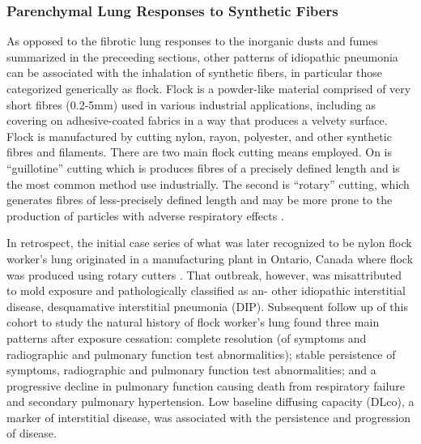 \documentclass[a4paper,12pt]{article}
\begin{document}
\subsubsection{Parenchymal Lung Responses to Synthetic Fibers}

As opposed to the fibrotic lung responses to the inorganic dusts and fumes summarized in the preceeding sections, other patterns of idiopathic pneumonia can be associated with the inhalation of synthetic fibers, in particular those categorized generically as flock. Flock is a powder-like material comprised of very short fibres (0.2-5mm) used in various industrial applications, including as covering on adhesive-coated fabrics in a way that produces a velvety surface. Flock is manufactured by cutting nylon, rayon, polyester, and other synthetic fibres and filaments. There are two main flock cutting means employed. On is “guillotine” cutting which is produces fibres of a precisely defined length and is the most common method use industrially. The second is “rotary” cutting, which generates fibres of less-precisely defined length and may be more prone to the production of particles  with adverse respiratory effects \cite{Kern1998}.

In retrospect, the initial case series of what was later recognized to be nylon flock worker’s lung originated in a manufacturing plant in Ontario, Canada where flock was produced using rotary cutters \cite{Lougheed1995}. That outbreak, however, was misattributed to mold exposure and pathologically classified as an- other idiopathic interstitial disease, desquamative interstitial pneumonia (DIP). Subsequent follow up of this cohort to study the natural history of flock worker’s lung \cite{Turcotte2013} found three main patterns after exposure cessation: complete resolution (of symptoms and radiographic and pulmonary function test abnormalities); stable persistence of symptoms, radiographic and pulmonary function test abnormalities; and a progressive decline in pulmonary function causing death from respiratory failure and secondary pulmonary hypertension. Low baseline diffusing capacity (DLco), a marker of interstitial disease, was associated with the persistence and progression of disease.
\end{document}
